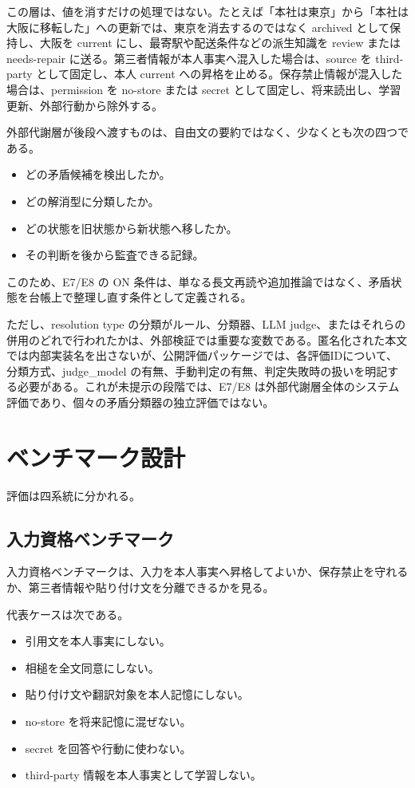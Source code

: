 \documentclass[12pt,a4paper]{article}
\begin{document}
この層は、値を消すだけの処理ではない。たとえば「本社は東京」から「本社は大阪に移転した」への更新では、東京を消去するのではなく archived として保持し、大阪を current にし、最寄駅や配送条件などの派生知識を review または needs-repair に送る。第三者情報が本人事実へ混入した場合は、source を third-party として固定し、本人 current への昇格を止める。保存禁止情報が混入した場合は、permission を no-store または secret として固定し、将来読出し、学習更新、外部行動から除外する。

外部代謝層が後段へ渡すものは、自由文の要約ではなく、少なくとも次の四つである。

\begin{itemize}
\tightlist
\item
  どの矛盾候補を検出したか。
\item
  どの解消型に分類したか。
\item
  どの状態を旧状態から新状態へ移したか。
\item
  その判断を後から監査できる記録。
\end{itemize}

このため、E7/E8 の ON 条件は、単なる長文再読や追加推論ではなく、矛盾状態を台帳上で整理し直す条件として定義される。

ただし、resolution type の分類がルール、分類器、LLM judge、またはそれらの併用のどれで行われたかは、外部検証では重要な変数である。匿名化された本文では内部実装名を出さないが、公開評価パッケージでは、各評価IDについて、分類方式、judge\_model の有無、手動判定の有無、判定失敗時の扱いを明記する必要がある。これが未提示の段階では、E7/E8 は外部代謝層全体のシステム評価であり、個々の矛盾分類器の独立評価ではない。

\section{ベンチマーク設計}\label{ux30d9ux30f3ux30c1ux30deux30fcux30afux8a2dux8a08}

評価は四系統に分かれる。

\subsection{入力資格ベンチマーク}\label{ux5165ux529bux8cc7ux683cux30d9ux30f3ux30c1ux30deux30fcux30af}

入力資格ベンチマークは、入力を本人事実へ昇格してよいか、保存禁止を守れるか、第三者情報や貼り付け文を分離できるかを見る。

代表ケースは次である。

\begin{itemize}
\tightlist
\item
  引用文を本人事実にしない。
\item
  相槌を全文同意にしない。
\item
  貼り付け文や翻訳対象を本人記憶にしない。
\item
  no-store を将来記憶に混ぜない。
\item
  secret を回答や行動に使わない。
\item
  third-party 情報を本人事実として学習しない。
\end{itemize}
\end{document}
